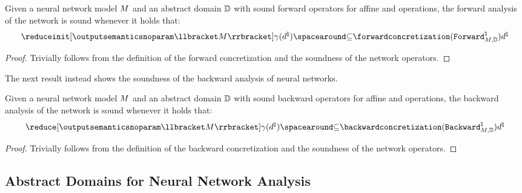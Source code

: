 \begin{lemma}
  Given a neural network model $M$ and an abstract domain $\mathbb{D}$ with sound forward operators for affine and \relu{} operations, the forward analysis of the network is sound whenever it holds that:
  \[
    \reduceinit[\outputsemanticsnoparam\semanticsof{\defmodel}]{\abstractdomainconcretization(\defabstractvalue)} \SubseteQ \forwardconcretization(\abstractdomainforward_{\defmodel, \abstractdomain})\defabstractvalue
  \]
  \end{lemma}
\begin{proof}
  Trivially follows from the definition of the forward concretization and the soundness of the network operators.
\end{proof}


The next result instead shows the soundness of the backward analysis of neural networks.

\begin{lemma}
  Given a neural network model $M$ and an abstract domain $\mathbb{D}$ with sound backward operators for affine and \relu{} operations, the backward analysis of the network is sound whenever it holds that:
  \[
    \reduce[\outputsemanticsnoparam\semanticsof{\defmodel}]{\abstractdomainconcretization(\defabstractvalue)} \SubseteQ \backwardconcretization(\abstractdomainbackward_{\defmodel, \abstractdomain})\defabstractvalue
  \]
  \end{lemma}
\begin{proof}
  Trivially follows from the definition of the backward concretization and the soundness of the network operators.
\end{proof}


\subsection{Abstract Domains for Neural Network Analysis}


